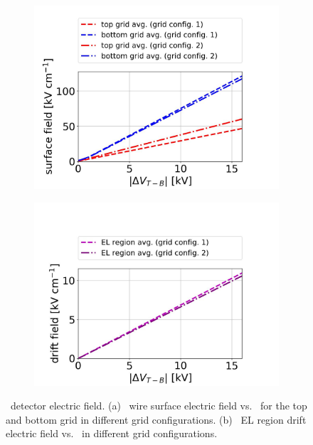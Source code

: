 \begin{figure}[!htbp]
	\centering
	\begin{subfigure}[b]{0.8\textwidth}
		\centering
		\includegraphics[width=\figurewidth,clip,trim={0 0 0 0},angle=0,origin=c]{Figures/GasTest/ElectricField/SurfaceElectricFieldGas.jpg}
		\caption[]{}
		\label{fig:surface electric field dV}
	\end{subfigure}
	\par\bigskip
	\begin{subfigure}[b]{0.8\textwidth}
		\centering
		\includegraphics[width=\figurewidth,clip,trim={0 0 0 0}]{Figures/GasTest/ElectricField/DriftElectricFieldGas.jpg}
		\caption{}
		\label{fig:drift electric field dV}
	\end{subfigure}
	\caption[\gtest\ detector electric field.]{\gtest\ detector electric field. (a) \gtest\ wire surface electric field vs. \opdv\ for the top and bottom grid in different grid configurations. (b) \gtest\ EL region drift electric field vs. \opdv\ in different grid configurations.}
	\label{fig:gtest electric field}
\end{figure} %

